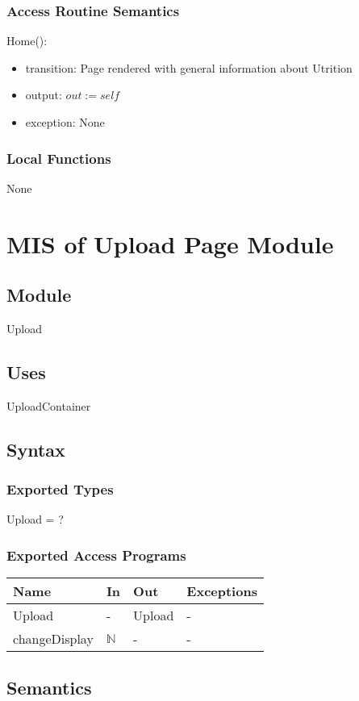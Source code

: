 \documentclass[12pt, titlepage]{article}
\begin{document}
\subsubsection{Access Routine Semantics}
\noindent Home():
\begin{itemize}
	\item transition: Page rendered with general information about Utrition
	\item output: $out := self$
	\item exception: None
\end{itemize}
\subsubsection{Local Functions}
None

\newpage

\section{MIS of Upload Page Module}
\subsection{Module}
Upload
\subsection{Uses}
UploadContainer
\subsection{Syntax}
\subsubsection{Exported Types}
Upload = ?
\subsubsection{Exported Access Programs}
\begin{center}
	\begin{tabular}{p{3.5cm} p{4cm} p{4cm} p{2cm}}
		\hline
		\textbf{Name} & \textbf{In} & \textbf{Out} & \textbf{Exceptions} \\
		\hline
		Upload & - & Upload & - \\
		changeDisplay & $\mathbb{N}$ & - & -\\
		\hline
	\end{tabular}
\end{center}
\subsection{Semantics}
\end{document}
